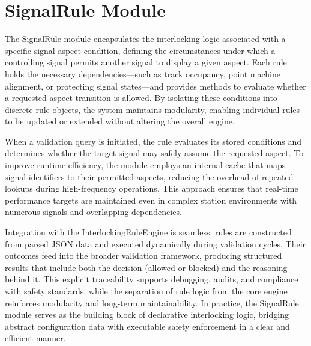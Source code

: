 \section{SignalRule Module}
\label{sec:methodology:signal-rule}

The SignalRule module encapsulates the interlocking logic associated with a specific signal aspect condition, defining the circumstances under which a controlling signal permits another signal to display a given aspect. Each rule holds the necessary dependencies—such as track occupancy, point machine alignment, or protecting signal states—and provides methods to evaluate whether a requested aspect transition is allowed. By isolating these conditions into discrete rule objects, the system maintains modularity, enabling individual rules to be updated or extended without altering the overall engine.

When a validation query is initiated, the rule evaluates its stored conditions and determines whether the target signal may safely assume the requested aspect. To improve runtime efficiency, the module employs an internal cache that maps signal identifiers to their permitted aspects, reducing the overhead of repeated lookups during high-frequency operations. This approach ensures that real-time performance targets are maintained even in complex station environments with numerous signals and overlapping dependencies.

Integration with the InterlockingRuleEngine is seamless: rules are constructed from parsed JSON data and executed dynamically during validation cycles. Their outcomes feed into the broader validation framework, producing structured results that include both the decision (allowed or blocked) and the reasoning behind it. This explicit traceability supports debugging, audits, and compliance with safety standards, while the separation of rule logic from the core engine reinforces modularity and long-term maintainability. In practice, the SignalRule module serves as the building block of declarative interlocking logic, bridging abstract configuration data with executable safety enforcement in a clear and efficient manner.
